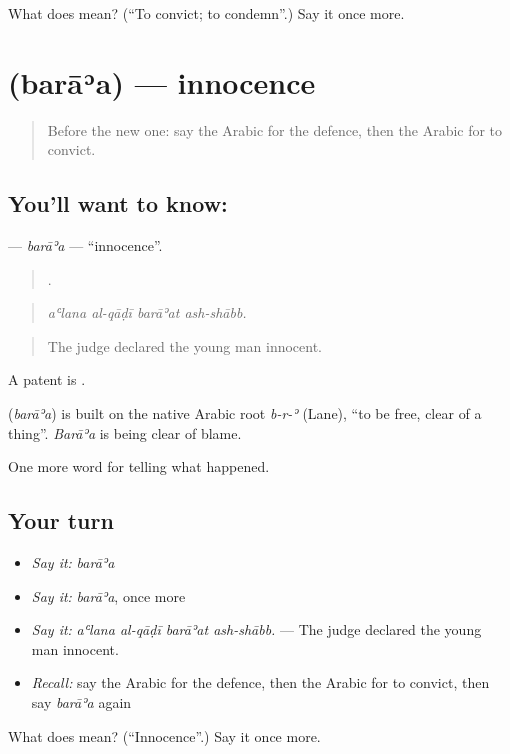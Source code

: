 \begin{tcolorbox}[breakable,colback=teal!4,colframe=teal!35!black,title={Before you move on}]
What does  mean? (\textquotedblleft{}To convict; to condemn\textquotedblright{}.) Say it once more.
\end{tcolorbox}
\section[\texorpdfstring{\ar{براءة} (barāʾa)}{براءة (barāʾa)}]{ (barāʾa) — innocence}

\label{lesson:AR-C334-baraa}



\begin{quote}
Before the new one: say the Arabic for the defence, then the Arabic for to convict.
\end{quote}

\subsection*{You'll want to know: }
\textbf{} — \emph{barāʾa} — \textquotedblleft{}innocence\textquotedblright{}.

\begin{quote}
   .
\end{quote}

\begin{quote}
\emph{aʿlana al-qāḍī barāʾat ash-shābb.}
\end{quote}

\begin{quote}
The judge declared the young man innocent.
\end{quote}

A patent is  .

\begin{cousinweb}
\textbf{} (\emph{barāʾa}) is built on the native Arabic root \emph{b-r-ʾ} (Lane), \textquotedblleft{}to be free, clear of a thing\textquotedblright{}. \emph{Barāʾa} is being clear of blame.
\end{cousinweb}

\begin{grammarlens}[title={What you've built}]
One more word for telling what happened.
\end{grammarlens}

\subsection*{Your turn}
\begin{itemize}
\raggedright
  \item \emph{Say it:} \emph{barāʾa}
  \item \emph{Say it:} \emph{barāʾa}, once more
  \item \emph{Say it:} \emph{aʿlana al-qāḍī barāʾat ash-shābb.} — The judge declared the young man innocent.
  \item \emph{Recall:} say the Arabic for the defence, then the Arabic for to convict, then say \emph{barāʾa} again
\end{itemize}

\begin{tcolorbox}[breakable,colback=teal!4,colframe=teal!35!black,title={Before you move on}]
What does  mean? (\textquotedblleft{}Innocence\textquotedblright{}.) Say it once more.
\end{tcolorbox}
